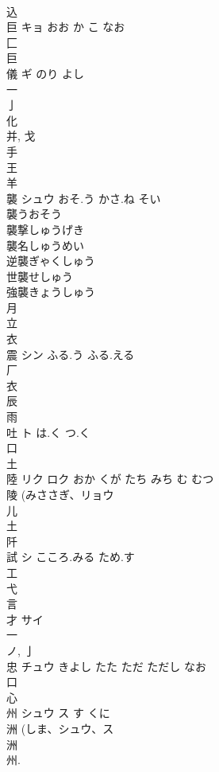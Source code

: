 \documentclass[8pt]{extreport}
\begin{document}
\begin{CJK}{UTF8}{min}
\\	込 
\\	巨	キョ	おお か こ なお	
\\	匚 
\\	巨 
\\	儀	ギ	のり よし	
\\	一 
\\	亅 
\\	化 
\\	并, 戈 
\\	手 
\\	王 
\\	羊 
\\	襲	シュウ	おそ.う かさ.ね そい	
\\	襲うおそう
\\	襲撃しゅうげき
\\	襲名しゅうめい
\\	逆襲ぎゃくしゅう
\\	世襲せしゅう
\\	強襲きょうしゅう
\\	月 
\\	立 
\\	衣 
\\	震	シン	ふる.う ふる.える	
\\	厂 
\\	衣 
\\	辰 
\\	雨 
\\	吐	ト	は.く つ.く	
\\	口 
\\	土 
\\	陸	リク ロク	おか くが たち みち む むつ	
\\	陵 (みささぎ、リョウ 
\\	儿 
\\	土 
\\	阡	
\\	試	シ	こころ.みる ため.す	
\\	工 
\\	弋 
\\	言 
\\	才	サイ		
\\	一 
\\	ノ, 亅 
\\	忠	チュウ	きよし たた ただ ただし なお	
\\	口 
\\	心 
\\	州	シュウ ス	す くに	
\\	洲 (しま、シュウ、ス 
\\	洲 
\\	州. 

\end{CJK}
\end{document}
